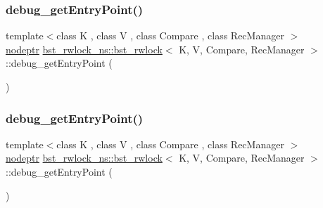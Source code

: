\mbox{\label{classbst__rwlock__ns_1_1bst__rwlock_a63f6ecffb9692643fef6cfd07d51bae3}} 
\subsubsection{\texorpdfstring{debug\+\_\+get\+Entry\+Point()}{debug\_getEntryPoint()}\hspace{0.1cm}{\footnotesize\ttfamily [1/2]}}
{\footnotesize\ttfamily template$<$class K , class V , class Compare , class Rec\+Manager $>$ \\
\hyperlink{bst__rwlock__impl_8h_a04158d2a20768fe447133ff555823b05}{nodeptr} \hyperlink{classbst__rwlock__ns_1_1bst__rwlock}{bst\+\_\+rwlock\+\_\+ns\+::bst\+\_\+rwlock}$<$ K, V, Compare, Rec\+Manager $>$\+::debug\+\_\+get\+Entry\+Point (\begin{DoxyParamCaption}{ }\end{DoxyParamCaption})\hspace{0.3cm}{\ttfamily [inline]}}

\mbox{\label{classbst__rwlock__ns_1_1bst__rwlock_a63f6ecffb9692643fef6cfd07d51bae3}} 
\subsubsection{\texorpdfstring{debug\+\_\+get\+Entry\+Point()}{debug\_getEntryPoint()}\hspace{0.1cm}{\footnotesize\ttfamily [2/2]}}
{\footnotesize\ttfamily template$<$class K , class V , class Compare , class Rec\+Manager $>$ \\
\hyperlink{bst__rwlock__impl_8h_a04158d2a20768fe447133ff555823b05}{nodeptr} \hyperlink{classbst__rwlock__ns_1_1bst__rwlock}{bst\+\_\+rwlock\+\_\+ns\+::bst\+\_\+rwlock}$<$ K, V, Compare, Rec\+Manager $>$\+::debug\+\_\+get\+Entry\+Point (\begin{DoxyParamCaption}{ }\end{DoxyParamCaption})\hspace{0.3cm}{\ttfamily [inline]}}

